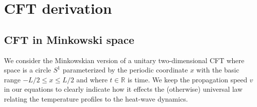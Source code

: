 \documentclass[12pt,a4paper]{article}
\def\nsection#1{\section{#1}\setcounter{equation}{0}}
\newcommand{\SL}{S^1}
\newcommand{\R}{\mathbb{R}}
\theoremstyle{definition}
\theoremstyle{remark}
\begin{document}

\nsection{CFT derivation}
\label{sec:3}


\subsection{CFT in Minkowski space} 
\label{subsec:3.1}

We consider the Minkowskian version of a unitary two-dimensional CFT where space is a circle $\SL$ parameterized by the periodic coordinate $x$ with the basic range $-L/2\leq x\leq L/2$ and where $t\in\R$ is time.
We keep the propagation speed $v$ in our equations to clearly indicate
how it effects the (otherwise) universal law relating the temperature
profiles to the heat-wave dynamics.
      
\end{document}
